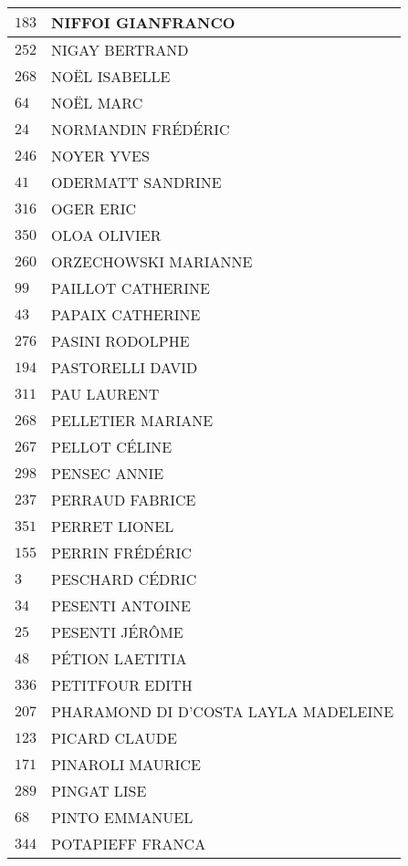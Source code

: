 \begin{xltabular}{\linewidth}{|l|X|}
    \hline
    $183$ & NIFFOI GIANFRANCO \\
    \hline
    $252$ & NIGAY BERTRAND \\
    \hline
    $268$ & NOËL ISABELLE \\
    \hline
    $64$ & NOËL MARC \\
    \hline
    $24$ & NORMANDIN FRÉDÉRIC \\
    \hline
    $246$ & NOYER YVES \\
    \hline
    $41$ & ODERMATT SANDRINE \\
    \hline
    $316$ & OGER ERIC \\
    \hline
    $350$ & OLOA OLIVIER \\
    \hline
    $260$ & ORZECHOWSKI MARIANNE \\
    \hline
    $99$ & PAILLOT CATHERINE \\
    \hline
    $43$ & PAPAIX CATHERINE \\
    \hline
    $276$ & PASINI RODOLPHE \\
    \hline
    $194$ & PASTORELLI DAVID \\
    \hline
    $311$ & PAU LAURENT \\
    \hline
    $268$ & PELLETIER MARIANE \\
    \hline
    $267$ & PELLOT CÉLINE \\
    \hline
    $298$ & PENSEC ANNIE \\
    \hline
    $237$ & PERRAUD FABRICE \\
    \hline
    $351$ & PERRET LIONEL \\
    \hline
    $155$ & PERRIN FRÉDÉRIC \\
    \hline
    $3$ & PESCHARD CÉDRIC \\
    \hline
    $34$ & PESENTI ANTOINE \\
    \hline
    $25$ & PESENTI JÉRÔME \\
    \hline
    $48$ & PÉTION LAETITIA \\
    \hline
    $336$ & PETITFOUR EDITH \\
    \hline
    $207$ & PHARAMOND DI D'COSTA LAYLA MADELEINE \\
    \hline
    $123$ & PICARD CLAUDE \\
    \hline
    $171$ & PINAROLI MAURICE \\
    \hline
    $289$ & PINGAT LISE \\
    \hline
    $68$ & PINTO EMMANUEL \\
    \hline
    $344$ & POTAPIEFF FRANCA \\

\end{xltabular}

